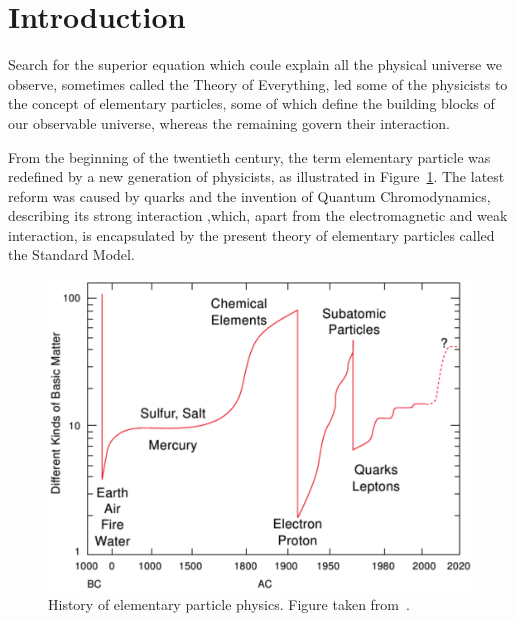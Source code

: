 \documentclass[a4paper,11pt,twoside,openright]{book}
\begin{document}
\clearpage
{}
\listoffigures

\cleardoublepage

\clearpage
{}
\setcounter{page}{1}

\chapter*{Introduction}

Search for the superior equation which coule explain all the physical universe
we observe, sometimes called the Theory of Everything, led some of the
physicists to the concept of elementary particles, some of which define the
building blocks of our observable universe, whereas the remaining govern their
interaction.

From the beginning of the twentieth century, the term elementary particle
was redefined by a new generation of physicists, as illustrated in
Figure~\ref{fig:HistoryOfElPartPhysics}. The latest reform was caused by quarks
and the invention of Quantum Chromodynamics, describing its strong interaction
,which, apart from the electromagnetic and weak interaction, is encapsulated
by the present theory of elementary particles called the Standard Model. 

\begin{figure}[t]
  \centering
  \includegraphics[width=\textwidth]{Introduction/HistoryOfElementaryParticlePhysics.png}
  \caption[History of elementary particle physics.]{History of elementary
    particle physics. Figure taken from~\cite{LatticeQCDForPedestrians}.}
  \label{fig:HistoryOfElPartPhysics}
\end{figure}
\end{document}

